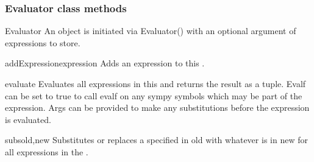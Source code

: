 \subsubsection{Evaluator class methods}
\begin{classdesc}{Evaluator}{}
An \EVALUATOR object is initiated via Evaluator() with an optional argument of expressions to store.
\end{classdesc}
\begin{methoddesc}[Evaluator]{addExpression}{expression}
Adds an expression to this \EVALUATOR.
\end{methoddesc}
\begin{methoddesc}[Evaluator]{evaluate}{}
Evaluates all expressions in this \EVALUATOR and returns the result as a tuple.  Evalf can be set to true to call evalf on any sympy symbols which may be part of the expression.
Args can be provided to make any substitutions before the expression is evaluated.
\end{methoddesc}
\begin{methoddesc}[Evaluator]{subs}{old,new}
Substitutes or replaces a \SYMBOL specified in old with whatever is in new for all expressions in the \EVALUATOR.
\end{methoddesc}

